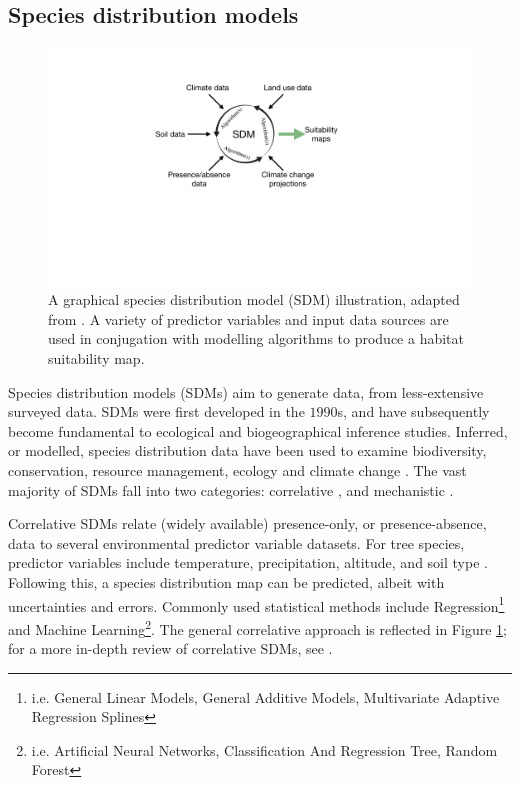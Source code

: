 \subsection{Species distribution models}

\begin{figure}
    \centering
    \includegraphics[scale=0.35]{chapter2/figures/SDM-fig.pdf}
    \caption{A graphical species distribution model (SDM) illustration, adapted from \cite{SDM_1}. 
             A variety of predictor variables and input data sources are used in conjugation with modelling algorithms to produce
             a habitat suitability map.}
    \label{fig:sdm}
\end{figure}

Species distribution models (SDMs) aim to generate data, from less-extensive surveyed data.
SDMs were first developed in the $1990$s, and have subsequently become fundamental to ecological and biogeographical inference studies.
Inferred, or modelled, species distribution data have been used to examine biodiversity, conservation, resource management, 
ecology and climate change \cite{austin2011improving, franklin2013species, skov2016real, wittmann2016confronting, 10.3958/059.037.0110, zhang2019using}.
The vast majority of SDMs fall into two categories: correlative \cite{srivastava2019species}, and mechanistic \cite{shabani2016comparison}.

Correlative SDMs relate (widely available) presence-only, or presence-absence, data to several environmental predictor variable datasets.
For tree species, predictor variables include temperature, precipitation, altitude, and soil type \cite{hill.data}.
Following this, a species distribution map can be predicted, albeit with  uncertainties and errors.
Commonly used statistical methods include Regression\footnote{
i.e. General Linear Models, General Additive Models, Multivariate Adaptive Regression Splines} and Machine Learning\footnote{
i.e. Artificial Neural Networks, Classification And Regression Tree, Random Forest}. The general correlative approach is reflected in Figure \ref{fig:sdm}; for a more in-depth review of correlative SDMs, see \cite{SDM_1}.


